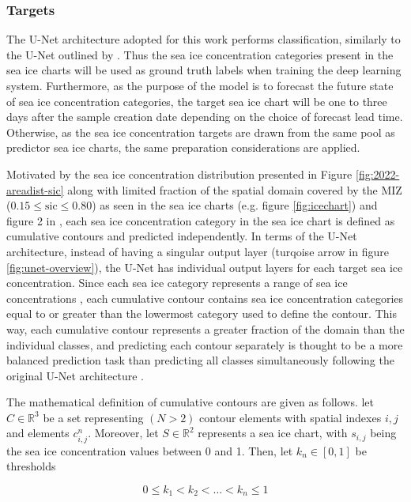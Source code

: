 \documentclass[../main/thesis]{subfiles}
\begin{document}
\subsubsection{Targets}
\label{sec:data_targets}
The U-Net architecture adopted for this work performs classification, similarly to the U-Net outlined by \citet{Ronneberger2015}. Thus the sea ice concentration categories present in the sea ice charts \citep{Dinessen2020} will be used as ground truth labels when training the deep learning system. Furthermore, as the purpose of the model is to forecast the future state of sea ice concentration categories, the target sea ice chart will be one to three days after the sample creation date depending on the choice of forecast lead time. Otherwise, as the sea ice concentration targets are drawn from the same pool as predictor sea ice charts, the same preparation considerations are applied.

Motivated by the sea ice concentration distribution presented in Figure \ref{fig:2022-areadist-sic} along with limited fraction of the spatial domain covered by the MIZ ($0.15 \leq \text{sic} \leq 0.80$) as seen in the sea ice charts (e.g. figure \ref{fig:icechart}) and figure 2 in \citet{Strong2012}, each sea ice concentration category in the sea ice chart is defined as cumulative contours and predicted independently. In terms of the U-Net architecture, instead of having a singular output layer (turqoise arrow in figure \ref{fig:unet-overview}), the U-Net has individual output layers for each target sea ice concentration. Since each sea ice category represents a range of sea ice concentrations \citep{Dinessen2020}, each cumulative contour contains sea ice concentration categories equal to or greater than the lowermost category used to define the contour. This way, each cumulative contour represents a greater fraction of the domain than the individual classes, and predicting each contour separately is thought to be a more balanced prediction task than predicting all classes simultaneously following the original U-Net architecture \citep{Ronneberger2015}.

The mathematical definition of cumulative contours are given as follows. let $C \in \mathbb{R}^3$ be a set representing $(N > 2)$ contour elements with spatial indexes $i,j$ and elements $c_{i,j}^n$. Moreover, let $S \in \mathbb{R}^2$ represents a sea ice chart, with $s_{i,j}$ being the sea ice concentration values between 0 and 1. Then, let $k_n \in [0,1]$ be thresholds 

\begin{equation}
    \label{eq:cum_number}
    0 \leq k_1 < k_2 < \ldots < k_n \leq 1
\end{equation}
\end{document}

